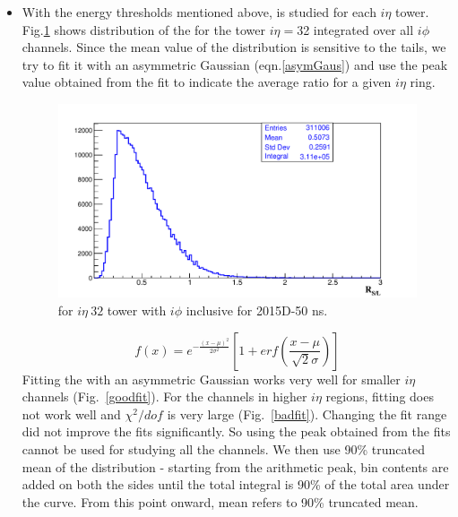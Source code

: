 \begin{itemize}
\item With the energy thresholds mentioned above, \ratiosl is studied 
for each $i\eta$ tower. Fig.\ref{1DRatio} shows distribution of
the \ratiosl for the tower $i\eta=$32 integrated over all $i \phi$ 
channels. Since the mean value of the distribution is sensitive to 
the tails, we try to fit it with an asymmetric Gaussian 
 (eqn.\ref{asymGaus}) and use the peak value obtained from the fit
to indicate the average ratio for a given $i\eta$ ring.

\begin{figure}[h!]
\centering
\includegraphics[width=0.7\linewidth]{../Figures/Chap2/ImageFiles_HF/Ratio/Ratioieta32254833El40.pdf}
\caption{\ratiosl for $i \eta\ 32$ tower with $i \phi$ inclusive for 2015D-50 ns.}
\label{1DRatio}
\end{figure}
\begin{equation}
f(x)=e^{-\frac{(x-\mu)^2}{2\sigma^2}}\left[ 1+erf\left( \frac{x-\mu}{\sqrt{2}\sigma}\right) \right] 
\label{asymGaus} 
\end{equation}
Fitting the \ratiosl with an asymmetric Gaussian works very well for 
smaller $i\eta$ channels (Fig.~\ref{goodfit}). For the channels in
higher $i\eta$ regions, fitting does not work well and $\chi^2/dof$ is 
very large (Fig.~\ref{badfit}). Changing the fit range did not improve the fits significantly. So using the peak obtained from the 
fits cannot be used for studying all the channels. We then use 90\% 
truncated mean of the distribution - starting from the arithmetic peak,
bin contents are added on both the sides until the total integral is
90\% of the total area under the curve. From this point onward, mean 
refers to 90\% truncated mean. 


\end{itemize}
